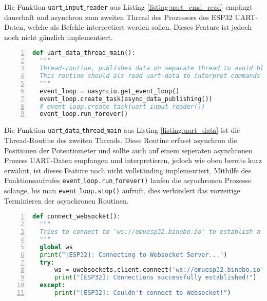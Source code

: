 \documentclass[paper=a4,12pt]{scrreprt}
\begin{document}
Die Funktion \texttt{uart$\_$input$\_$reader} aus Listing \ref{listing:uart_cmd_read} empängt dauerhaft und asynchron zum zweiten Thread des Prozessors des ESP32 UART-Daten, welche als Befehle
interpretiert werden sollen. Dieses Feature ist jedoch noch nicht gänzlich implementiert.\newline

\begin{lstlisting}[caption={Firmware: Thread-Routine zum Senden von Daten und UART-Daten empfangen}, captionpos=b, label={listing:uart_data}, language=python, morekeywords={async, await}, numbers=left,
  stepnumber=1]
def uart_data_thread_main():
  """
  Thread-routine, publishes data on separate thread to avoid blocking of data retrieving
  This routine should als read uart-data to interpret commands received while runtime, but this feature is not implemented yet
  """
  event_loop = uasyncio.get_event_loop()
  event_loop.create_task(async_data_publishing())
  # event_loop.create_task(uart_input_reader())
  event_loop.run_forever()
\end{lstlisting}

Die Funktion \texttt{uart$\_$data$\_$thread$\_$main} aus Listing \ref{listing:uart_data} ist die Thread-Routine des zweiten Threads. Diese Routine erfasst asynchron die Positionen der Potentiometer
und sollte auch auf einem seperaten asynchronen Prozess UART-Daten empfangen und interpretieren, jedoch wie oben bereits kurz erwähnt, ist dieses Feature noch nicht vollständing implementiert.\newline
Mithilfe des Funktionsaufrufes \texttt{event$\_$loop.run$\_$forever()} laufen die asynchronen Prozesse solange, bis man \texttt{event$\_$loop.stop()} aufruft, dies verhindert das vorzeitige Terminieren der asynchronen Routinen.\newline

\begin{lstlisting}[caption={Firmware: Funktion zum Erstellen einer Websocketverbindung}, captionpos=b, label={listing:connect_ws}, language=python, morekeywords={async, await}, numbers=left,
  stepnumber=1]
def connect_websocket():
  """
  Tries to connect to 'ws://emuesp32.binobo.io' to establish a websocket connection
  """
  global ws
  print("[ESP32]: Connecting to Websocket Server...")
  try:
      ws = uwebsockets.client.connect('ws://emuesp32.binobo.io')  #
      print("[ESP32]: Connections successfully established!")
  except:
      print("[ESP32]: Couldn't connect to Websocket!")
\end{lstlisting}
\end{document}
